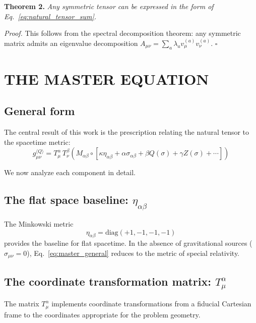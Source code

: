 \documentclass[11pt,a4paper]{article}
\theoremstyle{definition}
\theoremstyle{remark}
\begin{document}
	\textbf{Theorem 2.} \emph{Any symmetric tensor can be expressed in the form of Eq.~\eqref{eq:natural_tensor_sum}.}
	
	\emph{Proof.} This follows from the spectral decomposition theorem: any symmetric matrix admits an eigenvalue decomposition $A_{\mu\nu} = \sum_a \lambda_a v^{(a)}_\mu v^{(a)}_\nu$. $\square$
	
	\section{THE MASTER EQUATION}
	\label{sec:master}
	
	\subsection{General form}
	
	The central result of this work is the prescription relating the natural tensor to the spacetime metric:
	\begin{equation}
		g_{\mu\nu}^{\langle Q \rangle} = T^\alpha_\mu \, T^\beta_\nu \left( M_{\alpha\beta} \circ \left[\kappa\eta_{\alpha\beta} + \alpha\sigma_{\alpha\beta} + \beta Q(\sigma) + \gamma Z(\sigma) + \cdots \right] \right)
		\label{eq:master_general}
	\end{equation}
	
	We now analyze each component in detail.
	
	\subsection{The flat space baseline: $\eta_{\alpha\beta}$}
	
	The Minkowski metric
	\begin{equation}
		\eta_{\alpha\beta} = \text{diag}(+1, -1, -1, -1)
		\label{eq:minkowski}
	\end{equation}
	provides the baseline for flat spacetime. In the absence of gravitational sources ($\sigma_{\mu\nu} = 0$), Eq.~\eqref{eq:master_general} reduces to the metric of special relativity.
	
	\subsection{The coordinate transformation matrix: $T^\alpha_\mu$}
	
	The matrix $T^\alpha_\mu$ implements coordinate transformations from a fiducial Cartesian frame to the coordinates appropriate for the problem geometry.
	
\end{document}
